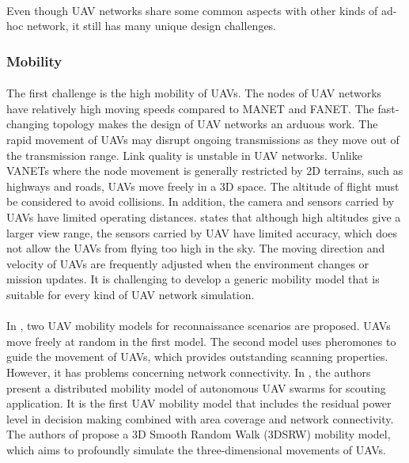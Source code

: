 \documentclass[a4paper,12pt]{report}
\begin{document}
\paragraph{}
Even though UAV networks share some common aspects with other kinds of ad-hoc network, it still has many unique design challenges. 

\subsubsection{Mobility}
\paragraph{}
The first challenge is the high mobility of UAVs. The nodes of UAV networks have relatively high moving speeds compared to MANET and FANET. The fast-changing topology makes the design of UAV networks an arduous work. The rapid movement of UAVs may disrupt ongoing transmissions as they move out of the transmission range. Link quality is unstable in UAV networks. Unlike VANETs where the node movement is generally restricted by 2D terrains, such as highways and roads, UAVs move freely in a 3D space. The altitude of flight must be considered to avoid collisions. In addition, the camera and sensors carried by UAVs have limited operating distances.\cite{Goodrich2008SupportingWS} states that although high altitudes give a larger view range, the sensors carried by UAV have limited accuracy, which does not allow the UAVs from flying too high in the sky. The moving direction and velocity of UAVs are frequently adjusted when the environment changes or mission updates. It is challenging to develop a generic mobility model that is suitable for every kind of UAV network simulation. 

\paragraph{}
In \cite{4124182}, two UAV mobility models for reconnaissance scenarios are proposed. UAVs move freely at random in the first model. The second model uses pheromones to guide the movement of UAVs, which provides outstanding scanning properties. However, it has problems concerning network connectivity. In \cite{7565125}, the authors present a distributed mobility model of autonomous UAV swarms for scouting application. It is the first UAV mobility model that includes the residual power level in decision making combined with area coverage and network connectivity. The authors of \cite{8855467} propose a 3D Smooth Random Walk (3DSRW) mobility model, which aims to profoundly simulate the three-dimensional movements of UAVs.
\end{document}
